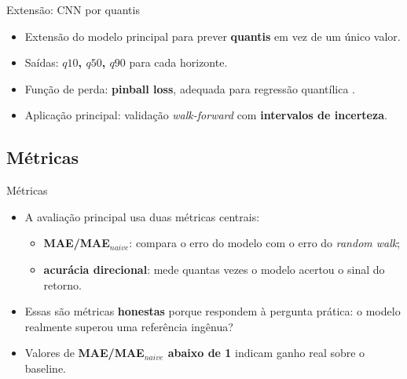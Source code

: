 \documentclass{libs/ufc_format}
\begin{document}
\begin{frame}{Extensão: CNN por quantis}
    \begin{itemize}
        \item Extensão do modelo principal para prever \textbf{quantis} em vez de um único valor.
        \item Saídas: \textbf{$q10$, $q50$, $q90$} para cada horizonte.
        \item Função de perda: \textbf{pinball loss}, adequada para regressão quantílica \cite{koenkerbassett1978}.
        \item Aplicação principal: validação \emph{walk-forward} com \textbf{intervalos de incerteza}.
    \end{itemize}

    \vspace{0.3cm}
\end{frame}

\subsection{Métricas}

\begin{frame}{Métricas}
    \begin{itemize}
        \item A avaliação principal usa duas métricas centrais:
        \begin{itemize}
            \item \textbf{MAE/MAE\(_{naive}\)}: compara o erro do modelo com o erro do \emph{random walk};
            \item \textbf{acurácia direcional}: mede quantas vezes o modelo acertou o sinal do retorno.
        \end{itemize}
        \item Essas são métricas \textbf{honestas} porque respondem à pergunta prática: o modelo realmente superou uma referência ingênua?
        \item Valores de \textbf{MAE/MAE\(_{naive}\) abaixo de 1} indicam ganho real sobre o baseline.
    \end{itemize}
\end{frame}
\end{document}
